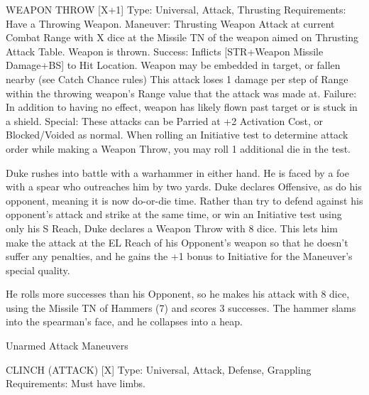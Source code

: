\documentclass[oneside,11pt,english]{book}
\begin{document}
 

 

WEAPON THROW [X+1] 
Type: Universal, Attack, Thrusting 
Requirements: Have a Throwing Weapon. 
Maneuver: Thrusting Weapon Attack at current Combat Range with X dice at the Missile TN of the 
weapon aimed on Thrusting Attack Table. Weapon is thrown. 
Success: Inflicts [STR+Weapon Missile Damage+BS] to Hit Location. Weapon may be embedded in 
target, or fallen nearby (see Catch Chance rules) This attack loses 1 damage per step of Range within the 
throwing weapon’s Range value that the attack was made at. 
Failure: In addition to having no effect, weapon has likely flown past target or is stuck in a shield. 
Special: These attacks can be Parried at +2 Activation Cost, or Blocked/Voided as normal. When rolling 
an Initiative test to determine attack order while making a Weapon Throw, you may roll 1 additional die 
in the test. 

 
Duke rushes into battle with a warhammer in either hand. He is faced by a foe with a spear who outreaches him by two yards. 
Duke declares Offensive, as do his opponent, meaning it is now do-or-die time. Rather than try to defend against his opponent’s 
attack and strike at the same time, or win an Initiative test using only his S Reach, Duke declares a Weapon Throw with 8 dice. 
This lets him make the attack at the EL Reach of his Opponent’s weapon so that he doesn’t suffer any penalties, and he gains the 
+1 bonus to Initiative for the Maneuver’s special quality. 

 
He rolls more successes than his Opponent, so he makes his attack with 8 dice, using the Missile TN of Hammers (7) and scores 3 
successes. The hammer slams into the spearman’s face, and he collapses into a heap. 

 

 

Unarmed Attack Maneuvers 

 

CLINCH (ATTACK) [X] 
Type: Universal, Attack, Defense, Grappling 
Requirements: Must have limbs. 
\end{document}
